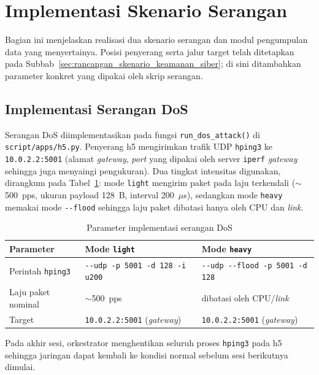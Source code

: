 \section{Implementasi Skenario Serangan}
\label{sec:implementasi_skenario_serangan}
Bagian ini menjelaskan realisasi dua skenario serangan dan modul pengumpulan data yang menyertainya. Posisi penyerang serta jalur target telah ditetapkan pada Subbab~\ref{sec:rancangan_skenario_keamanan_siber}; di sini ditambahkan parameter konkret yang dipakai oleh skrip serangan.

\subsection{Implementasi Serangan DoS}
\label{subsec:implementasi_serangan_dos}
Serangan \ac{DoS} diimplementasikan pada fungsi \texttt{run\_dos\_attack()} di \texttt{script/apps/h5.py}. Penyerang h5 mengirimkan trafik UDP \texttt{hping3} ke \texttt{10.0.2.2:5001} (alamat \textit{gateway}, \textit{port} yang dipakai oleh server \texttt{iperf} \textit{gateway} sehingga juga menyaingi pengukuran). Dua tingkat intensitas digunakan, dirangkum pada Tabel~\ref{tab:impl_dos_param}: mode \texttt{light} mengirim paket pada laju terkendali ($\sim$500~pps, ukuran payload 128~B, interval 200~$\mu$s), sedangkan mode \texttt{heavy} memakai mode \texttt{-{}-flood} sehingga laju paket dibatasi hanya oleh CPU dan \textit{link}.

\renewcommand{\arraystretch}{1.3}
\begin{table}[htbp]
    \centering
    \caption{Parameter implementasi serangan \ac{DoS}}
    \label{tab:impl_dos_param}
    \begin{tabular}{|l|l|l|}
        \hline
        \textbf{Parameter} & \textbf{Mode \texttt{light}} & \textbf{Mode \texttt{heavy}} \\ \hline
        Perintah \texttt{hping3} & \texttt{-{}-udp -p 5001 -d 128 -i u200} & \texttt{-{}-udp -{}-flood -p 5001 -d 128} \\ \hline
        Laju paket nominal & $\sim$500~pps & dibatasi oleh CPU/\textit{link} \\ \hline
        Target & \texttt{10.0.2.2:5001} (\textit{gateway}) & \texttt{10.0.2.2:5001} (\textit{gateway}) \\ \hline
    \end{tabular}
\end{table}

Pada akhir sesi, orkestrator menghentikan seluruh proses \texttt{hping3} pada h5 sehingga jaringan dapat kembali ke kondisi normal sebelum sesi berikutnya dimulai.

